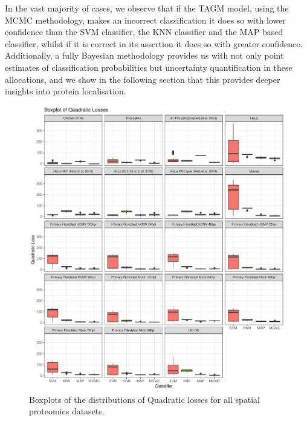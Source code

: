 \documentclass[12pt,english]{article}\usepackage[]{graphicx}\usepackage[]{color}
\makeatletter
\def\maxwidth{ %
  \ifdim\Gin@nat@width>\linewidth
    \linewidth
  \else
    \Gin@nat@width
  \fi
}
\newenvironment{knitrout}{}{} %
\makeatother
\begin{document}
In the vast majority of cases, we observe that if the TAGM model,
using the MCMC methodology, makes an incorrect classification it does
so with lower confidence than the SVM classifier, the KNN classifier
and the MAP based classifier, whilst if it is correct in its assertion
it does so with greater confidence. Additionally, a fully Bayesian
methodology provides us with not only point estimates of
classification probabilities but uncertainty quantification in these
allocations, and we show in the following section that this provides
deeper insights into protein localisation.



\begin{figure}[p]
  \centering
\begin{knitrout}
\color{fgcolor}
\includegraphics[width=\maxwidth]{figure/quadboxplots-1} 

\end{knitrout}
\caption{Boxplots of the distributions of Quadratic losses for all
  spatial proteomics datasets.}
  \label{figure::quadloss}
\end{figure}
\end{document}
